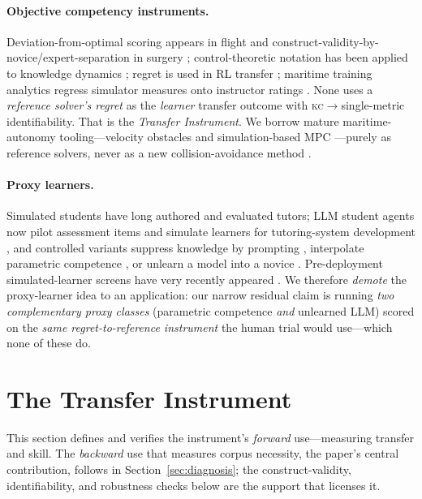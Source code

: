 \documentclass{article}
\newcommand{\kc}{\textsc{kc}}
\begin{document}
\paragraph{Objective competency instruments.} Deviation-from-optimal scoring appears in
flight \citep{zinn2023flight} and construct-validity-by-novice/expert-separation in surgery
\citep{vandongen2007lapsim}; control-theoretic notation has been applied to knowledge
dynamics \citep{controlkt2024}; regret is used in RL transfer \citep{transferregret2024};
maritime training analytics regress simulator measures onto instructor ratings
\citep{maritime2025}. None uses a \emph{reference solver's regret} as the
\emph{learner} transfer outcome with \kc$\to$single-metric identifiability. That is the
\emph{Transfer Instrument}.
We borrow mature maritime-autonomy tooling---velocity obstacles \citep{fiorini1998vo} and
simulation-based MPC \citep{johansen2016sbmpc}---purely as reference solvers, never as a new
collision-avoidance method \citep{colregcompliance2024,imo1972colregs}.

\paragraph{Proxy learners.} Simulated students have long authored and evaluated tutors; LLM
student agents now pilot assessment items \citep{luwang2024} and simulate learners for
tutoring-system development \citep{agent4edu2025}, and controlled variants suppress knowledge
by prompting \citep{apartsin2026}, interpolate parametric competence \citep{ps2_2026}, or
unlearn a model into a novice \citep{song2026unlearn}. Pre-deployment simulated-learner
screens have very recently appeared \citep{llmjudgeaudit2026,educlaw2026}. We therefore
\emph{demote} the proxy-learner idea to an application: our narrow residual claim is running
\emph{two complementary proxy classes} (parametric competence \emph{and} unlearned LLM)
scored on the \emph{same regret-to-reference instrument} the human trial would use---which
none of these do.

\section{The Transfer Instrument}
\label{sec:instrument}
This section defines and verifies the instrument's \emph{forward} use---measuring transfer and skill.
The \emph{backward} use that measures corpus necessity, the paper's central contribution, follows in
Section~\ref{sec:diagnosis}; the construct-validity, identifiability, and robustness checks below are
the support that licenses it.
\end{document}
